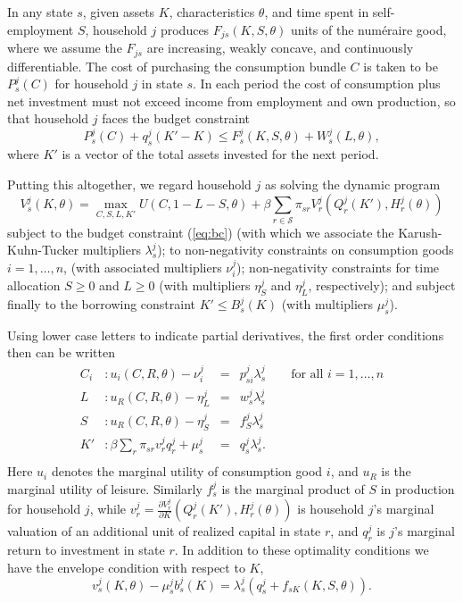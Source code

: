 \documentclass[11pt]{article}
\newcommand{\Eq}[1]{(\ref{eq:#1})}
\begin{document}
In any state $s$, given assets $K$, characteristics $\theta$, and time
spent in self-employment $S$, household \(j\) produces
$F_{js}(K,S,\theta)$ units of the numéraire good, where we assume the
$F_{js}$ are increasing, weakly concave, and continuously
differentiable.  The cost of purchasing the consumption bundle $C$ is
taken to be $P^j_s(C)$ for household \(j\) in state $s$.  In each
period the cost of consumption plus net investment must not exceed
income from employment and own production, so that household \(j\) faces
the budget constraint
\begin{equation} 
\label{eq:bc}
   P^j_s(C) + q^j_s(K'-K) \leq F^j_{s}(K,S,\theta) + W^j_{s}(L,\theta),
\end{equation}
where $K'$ is a vector of the total assets invested for the next
period.

Putting this altogether, we regard household \(j\) as solving the
dynamic program
\begin{equation}
\label{eq:bellman}
  V^j_{s}(K,\theta)=\max_{C,S,L,K'} U(C,1-L-S,\theta) +
  \beta\sum_{r\in\mathcal{S}}\pi_{sr}V^j_{r}\left(Q^j_{r}(K'),H^j_{r}(\theta)\right)
\end{equation}
subject to the budget constraint \Eq{bc} (with which we associate the
Karush-Kuhn-Tucker multipliers \(\lambda^j_s\)); to non-negativity
constraints on consumption goods $i=1,\dots,n$, (with associated
multipliers $\nu_i^j$); non-negativity constraints for time
allocation $S\geq 0$ and $L\geq 0$ (with multipliers $\eta^j_S$ and
$\eta^j_L$, respectively); and subject finally to the borrowing
constraint $K'\leq B^j_{s}(K)$ (with multipliers \(\mu^j_s\)).

Using lower case letters to indicate partial derivatives, the first order conditions then can be written
\begin{equation}
\label{eq:foc}
\begin{aligned}
  C_i &: u_i(C,R,\theta) - \nu^j_i &=& p^j_{si}\lambda^j_s \qquad\text{for all $i=1,\dots,n$}\\
  L   &: u_R(C,R,\theta) - \eta^j_L &=& w^j_s\lambda^j_s\\ 
  S   &: u_R(C,R,\theta) - \eta^j_S &=& f^j_{S}\lambda^j_s \\
  K'  &: \beta\sum_r\pi_{sr}v^j_{r}q^j_{r} + \mu^j_s &=& q^j_{s}\lambda^j_s.\\
\end{aligned}
\end{equation}
Here $u_i$ denotes the marginal utility of consumption good $i$, and $u_R$
is the marginal utility of leisure.  Similarly $f^j_{s}$ is the marginal
product of $S$ in production for household \(j\), while $v^j_{r}=\frac{\partial
   V^j_{r}}{\partial K}(Q^j_{r}(K'),H^j_{r}(\theta))$ is household \(j\)'s
marginal valuation of an additional unit of realized capital in state
$r$, and $q^j_{r}$ is \(j\)'s marginal return to investment in state
$r$.  In addition to these optimality conditions we have the envelope
condition with respect to $K$,
\begin{equation}
\label{eq:env}
  v^j_{s}(K,\theta) - \mu^j_sb^j_s(K) = \lambda^j_s\left(q^j_s + f_{sK}(K,S,\theta)\right).
\end{equation}
\end{document}
